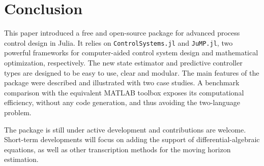 \section{Conclusion}

This paper introduced a free and open-source package for advanced process control design in Julia. It relies on \texttt{ControlSystems.jl} and \texttt{JuMP.jl}, two powerful frameworks for computer-aided control system design and mathematical optimization, respectively. The new state estimator and predictive controller types are designed to be easy to use, clear and modular. The main features of the package were described and illustrated with two case studies. A benchmark comparison with the equivalent MATLAB toolbox exposes its computational efficiency, without any code generation, and thus avoiding the two-language problem. 

The package is still under active development and contributions are welcome. Short-term developments will focus on adding the support of differential-algebraic equations, as well as other transcription methods for the moving horizon estimation.